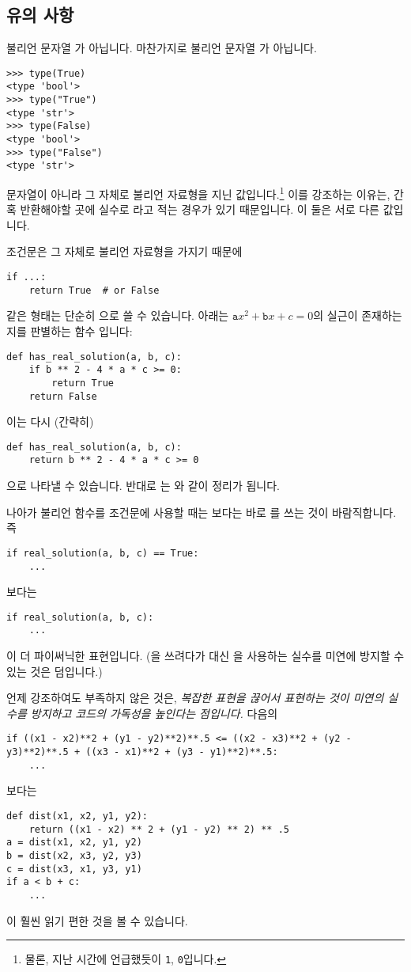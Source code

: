 \documentclass[../main.tex]{subfiles}
\begin{document}
\subsection{유의 사항}
불리언  문자열 가 아닙니다.
마찬가지로 불리언  문자열 가 아닙니다.
\begin{verbatim}
>>> type(True)
<type 'bool'>
>>> type("True")
<type 'str'>
>>> type(False)
<type 'bool'>
>>> type("False")
<type 'str'>
\end{verbatim}

 문자열이 아니라 그 자체로 불리언 자료형을 지닌 값입니다.\footnote{물론, 지난 시간에 언급했듯이  \texttt{1},  \texttt{0}입니다.}
이를 강조하는 이유는, 간혹  반환해야할 곳에 실수로
라고 적는 경우가 있기 때문입니다.
이 둘은 서로 다른 값입니다.

조건문은 그 자체로 불리언 자료형을 가지기 때문에
\begin{verbatim}
if ...:
    return True  # or False
\end{verbatim}
같은 형태는 단순히 으로 쓸 수 있습니다.
아래는 $\texttt{a}x^2 + \texttt{b}x + c = 0$의 실근이 존재하는지를 판별하는 함수 입니다:
\begin{verbatim}
def has_real_solution(a, b, c):
    if b ** 2 - 4 * a * c >= 0:
        return True
    return False
\end{verbatim}
이는 다시 (간략히)
\begin{verbatim}
def has_real_solution(a, b, c):
    return b ** 2 - 4 * a * c >= 0
\end{verbatim}
으로 나타낼 수 있습니다.
반대로 는 와 같이 정리가 됩니다.

나아가 불리언 함수를 조건문에 사용할 때는 보다는 바로 를 쓰는 것이 바람직합니다.
즉
\begin{verbatim}
if real_solution(a, b, c) == True:
    ...
\end{verbatim}
보다는
\begin{verbatim}
if real_solution(a, b, c):
    ...
\end{verbatim}
이 더 파이써닉한 표현입니다.
(을 쓰려다가 \pyin{==} 대신 \pyin{=}을 사용하는 실수를 미연에 방지할 수 있는 것은 덤입니다.)

언제 강조하여도 부족하지 않은 것은, \emph{복잡한 표현을 끊어서 표현하는 것이 미연의 실수를 방지하고 코드의 가독성을 높인다는 점입니다.}
다음의
\begin{verbatim}
if ((x1 - x2)**2 + (y1 - y2)**2)**.5 <= ((x2 - x3)**2 + (y2 - y3)**2)**.5 + ((x3 - x1)**2 + (y3 - y1)**2)**.5:
    ...
\end{verbatim}
보다는
\begin{verbatim}
def dist(x1, x2, y1, y2):
    return ((x1 - x2) ** 2 + (y1 - y2) ** 2) ** .5
a = dist(x1, x2, y1, y2)
b = dist(x2, x3, y2, y3)
c = dist(x3, x1, y3, y1)
if a < b + c:
    ...
\end{verbatim}
이 훨씬 읽기 편한 것을 볼 수 있습니다.
\end{document}
